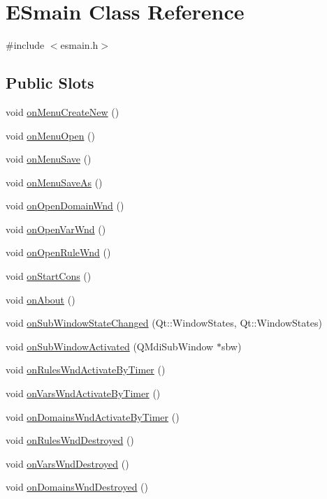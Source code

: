 \hypertarget{class_e_smain}{
\section{ESmain Class Reference}
\label{class_e_smain}
}


{\ttfamily \#include $<$esmain.h$>$}

\subsection*{Public Slots}
\begin{DoxyCompactItemize}
\item 
void \hyperlink{class_e_smain_a1ac1fa213213622cbcfbf5b0b7a0415c}{onMenuCreateNew} ()
\item 
void \hyperlink{class_e_smain_ac34b6704f3b327ca2733b06107e4f983}{onMenuOpen} ()
\item 
void \hyperlink{class_e_smain_a731ce8b5fd7810866df7049733a0c67b}{onMenuSave} ()
\item 
void \hyperlink{class_e_smain_a2442858ecb90f7ca6b6cee47ad03856d}{onMenuSaveAs} ()
\item 
void \hyperlink{class_e_smain_a10fddb17a7764f223f48bc1bc9854e14}{onOpenDomainWnd} ()
\item 
void \hyperlink{class_e_smain_ae82b4d4c1f4f70e3cd57a1f4bc10c325}{onOpenVarWnd} ()
\item 
void \hyperlink{class_e_smain_a158a98974b57937e8eb25f051b147054}{onOpenRuleWnd} ()
\item 
void \hyperlink{class_e_smain_ad6b3a877550c67bdaeb6ed093bc352b9}{onStartCons} ()
\item 
void \hyperlink{class_e_smain_a83881102611bed95912b4f7e70f39436}{onAbout} ()
\item 
void \hyperlink{class_e_smain_a48ef9a3c90285cc8d8ed42a77df2dfdc}{onSubWindowStateChanged} (Qt::WindowStates, Qt::WindowStates)
\item 
void \hyperlink{class_e_smain_aeb13c0dcac569c4e534690a7cf114339}{onSubWindowActivated} (QMdiSubWindow $\ast$sbw)
\item 
void \hyperlink{class_e_smain_aa98b02ba443c780cd6bc6cb66231031d}{onRulesWndActivateByTimer} ()
\item 
void \hyperlink{class_e_smain_abb079e99867b03d2acf2dde3b8590aef}{onVarsWndActivateByTimer} ()
\item 
void \hyperlink{class_e_smain_afb89a48e2dd64a126dca701ce2ed826c}{onDomainsWndActivateByTimer} ()
\item 
void \hyperlink{class_e_smain_a1fcdf96488a40dff3c6eedef147f25cc}{onRulesWndDestroyed} ()
\item 
void \hyperlink{class_e_smain_a24a7256c9f096be037b9842d32bf84b1}{onVarsWndDestroyed} ()
\item 
void \hyperlink{class_e_smain_a2db13f1d288487be6575e82c5a86db49}{onDomainsWndDestroyed} ()
\end{DoxyCompactItemize}
